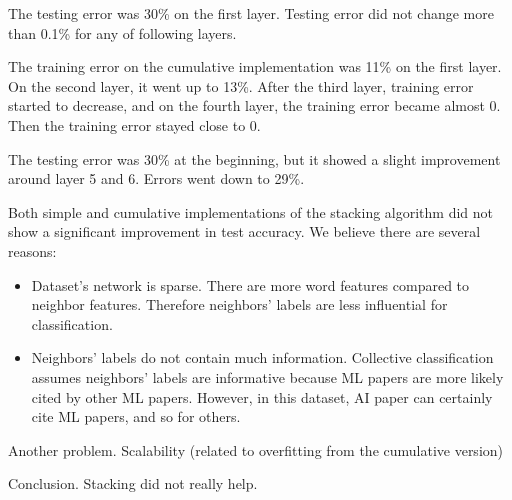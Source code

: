 The testing error was 30\% on the first layer. Testing error did not change more than 0.1\% for any of following layers.

The training error on the cumulative implementation was 11\% on the first layer. On the second layer, it went up to 13\%. After the third layer, training error started to decrease, and on the fourth layer, the training error became almost 0. Then the training error stayed close to 0. 

The testing error was 30\% at the beginning, but it showed a slight improvement around layer 5 and 6. Errors went down to 29\%. 

Both simple and cumulative implementations of the stacking algorithm did not show a significant improvement in test accuracy. We believe there are several reasons:
\begin{itemize}
	\item Dataset's network is sparse. There are more word features compared to neighbor features. Therefore neighbors' labels are less influential for classification.
	\item Neighbors' labels do not contain much information. Collective classification assumes neighbors' labels are informative because ML papers are more likely cited by other ML papers. However, in this dataset, AI paper can certainly cite ML papers, and so for others.
\end{itemize}

Another problem. Scalability (related to overfitting from the cumulative version)

Conclusion. Stacking did not really help.
 
 

